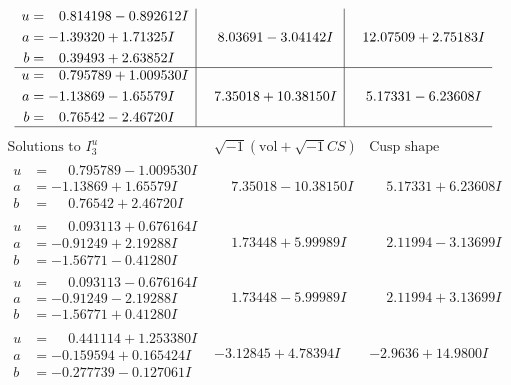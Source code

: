\documentclass[1p]{elsarticle_modified}
\theoremstyle{definition}
\newcommand{\I}{\sqrt{-1}}
\begin{document}
$$\begin{array}{c|c|c}
\begin{aligned}
u &= \phantom{-}0.814198 - 0.892612 I \\
a &= -1.39320 + 1.71325 I \\
b &= \phantom{-}0.39493 + 2.63852 I\end{aligned}
 & \phantom{-}8.03691 - 3.04142 I & \phantom{-}12.07509 + 2.75183 I \\ \hline\begin{aligned}
u &= \phantom{-}0.795789 + 1.009530 I \\
a &= -1.13869 - 1.65579 I \\
b &= \phantom{-}0.76542 - 2.46720 I\end{aligned}
 & \phantom{-}7.35018 + 10.38150 I & \phantom{-}5.17331 - 6.23608 I\\
 \hline 
 \end{array}$$\newpage$$\begin{array}{c|c|c}  
\text{Solutions to }I^u_{3}& \I (\text{vol} + \sqrt{-1}CS) & \text{Cusp shape}\\
 \hline 
\begin{aligned}
u &= \phantom{-}0.795789 - 1.009530 I \\
a &= -1.13869 + 1.65579 I \\
b &= \phantom{-}0.76542 + 2.46720 I\end{aligned}
 & \phantom{-}7.35018 - 10.38150 I & \phantom{-}5.17331 + 6.23608 I \\ \hline\begin{aligned}
u &= \phantom{-}0.093113 + 0.676164 I \\
a &= -0.91249 + 2.19288 I \\
b &= -1.56771 - 0.41280 I\end{aligned}
 & \phantom{-}1.73448 + 5.99989 I & \phantom{-}2.11994 - 3.13699 I \\ \hline\begin{aligned}
u &= \phantom{-}0.093113 - 0.676164 I \\
a &= -0.91249 - 2.19288 I \\
b &= -1.56771 + 0.41280 I\end{aligned}
 & \phantom{-}1.73448 - 5.99989 I & \phantom{-}2.11994 + 3.13699 I \\ \hline\begin{aligned}
u &= \phantom{-}0.441114 + 1.253380 I \\
a &= -0.159594 + 0.165424 I \\
b &= -0.277739 - 0.127061 I\end{aligned}
 & -3.12845 + 4.78394 I & -2.9636 + 14.9800 I \\ \hline\begin{aligned}

\end{aligned}
\end{array}$$
\end{document}
